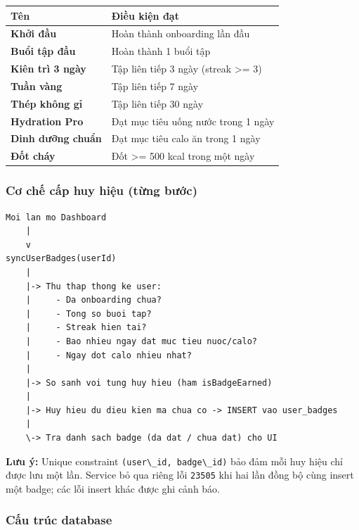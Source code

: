 \documentclass[12pt,a4paper]{article}
\newcounter{none}
\providecommand{\passthrough}[1]{#1}
\begin{document}
{\def\LTcaptype{none} %
\begin{longtable}[]{@{}ll@{}}
\toprule\noalign{}
Tên & Điều kiện đạt \\
\midrule\noalign{}
\endhead
\bottomrule\noalign{}
\endlastfoot
\textbf{Khởi đầu} & Hoàn thành onboarding lần đầu \\
\textbf{Buổi tập đầu} & Hoàn thành 1 buổi tập \\
\textbf{Kiên trì 3 ngày} & Tập liên tiếp 3 ngày (streak \textgreater=
3) \\
\textbf{Tuần vàng} & Tập liên tiếp 7 ngày \\
\textbf{Thép không gỉ} & Tập liên tiếp 30 ngày \\
\textbf{Hydration Pro} & Đạt mục tiêu uống nước trong 1 ngày \\
\textbf{Dinh dưỡng chuẩn} & Đạt mục tiêu calo ăn trong 1 ngày \\
\textbf{Đốt cháy} & Đốt \textgreater= 500 kcal trong một ngày \\
\end{longtable}
}

\subsubsection{Cơ chế cấp huy hiệu (từng
bước)}\label{cux1a1-chux1ebf-cux1ea5p-huy-hiux1ec7u-tux1eebng-bux1b0ux1edbc}

\begin{lstlisting}
Moi lan mo Dashboard
    |
    v
syncUserBadges(userId)
    |
    |-> Thu thap thong ke user:
    |     - Da onboarding chua?
    |     - Tong so buoi tap?
    |     - Streak hien tai?
    |     - Bao nhieu ngay dat muc tieu nuoc/calo?
    |     - Ngay dot calo nhieu nhat?
    |
    |-> So sanh voi tung huy hieu (ham isBadgeEarned)
    |
    |-> Huy hieu du dieu kien ma chua co -> INSERT vao user_badges
    |
    \-> Tra danh sach badge (da dat / chua dat) cho UI
\end{lstlisting}

\textbf{Lưu ý:} Unique constraint
\passthrough{\lstinline!(user\_id, badge\_id)!} bảo đảm mỗi huy hiệu chỉ
được lưu một lần. Service bỏ qua riêng lỗi
\passthrough{\lstinline!23505!} khi hai lần đồng bộ cùng insert một
badge; các lỗi insert khác được ghi cảnh báo.

\subsubsection{Cấu trúc database}\label{cux1ea5u-truxfac-database}
\end{document}
